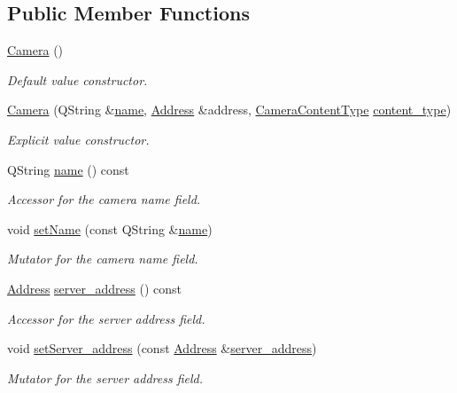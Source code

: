 \subsection*{Public Member Functions}
\begin{DoxyCompactItemize}
\item 
\hyperlink{classCamera_a01f94c3543f56ede7af49dc778f19331}{Camera} ()
\begin{DoxyCompactList}\small\item\em Default value constructor. \end{DoxyCompactList}\item 
\hyperlink{classCamera_a5a4ceda635ed01219348078adddb141b}{Camera} (Q\-String \&\hyperlink{classCamera_a5763757e8d6adb6437dde2502072a3b1}{name}, \hyperlink{classAddress}{Address} \&address, \hyperlink{camera_8h_a10395294162cb49637e9c8f6efdb10ea}{Camera\-Content\-Type} \hyperlink{classCamera_aafe2614c711fb5465dacaeea55e12f64}{content\-\_\-type})
\begin{DoxyCompactList}\small\item\em Explicit value constructor. \end{DoxyCompactList}\item 
Q\-String \hyperlink{classCamera_a5763757e8d6adb6437dde2502072a3b1}{name} () const 
\begin{DoxyCompactList}\small\item\em Accessor for the camera name field. \end{DoxyCompactList}\item 
void \hyperlink{classCamera_a4f009de64587caa5e2a91a2cdd18fd32}{set\-Name} (const Q\-String \&\hyperlink{classCamera_a5763757e8d6adb6437dde2502072a3b1}{name})
\begin{DoxyCompactList}\small\item\em Mutator for the camera name field. \end{DoxyCompactList}\item 
\hyperlink{classAddress}{Address} \hyperlink{classCamera_aa93654bec9b65adfb95e192ac9c71e80}{server\-\_\-address} () const 
\begin{DoxyCompactList}\small\item\em Accessor for the server address field. \end{DoxyCompactList}\item 
void \hyperlink{classCamera_a678d67d964307ffc9e323d74c7a28ca1}{set\-Server\-\_\-address} (const \hyperlink{classAddress}{Address} \&\hyperlink{classCamera_aa93654bec9b65adfb95e192ac9c71e80}{server\-\_\-address})
\begin{DoxyCompactList}\small\item\em Mutator for the server address field. \end{DoxyCompactList}\item 

\end{DoxyCompactItemize}
